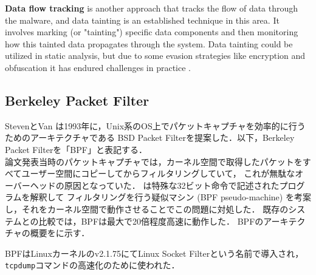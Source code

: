 \textbf{Data flow tracking} is another approach that tracks the flow of data through the malware, and data tainting is an established
technique in this area. It involves marking (or "tainting") specific data components and then monitoring
how this tainted data propagates through the system.
Data tainting could be utilized in static analysis, but due to some evasion strategies like encryption and obfuscation
it has endured challenges in practice \cite{alashjee2019dynamic}.




\subsection{Berkeley Packet Filter}
StevenとVan \cite{mccanne1993bsd}は1993年に，Unix系のOS上でパケットキャプチャを効率的に行うためのアーキテクチャである
BSD Packet Filterを提案した．以下，Berkeley Packet Filterを「BPF」と表記する． \\
論文発表当時のパケットキャプチャでは，カーネル空間で取得したパケットをすべてユーザー空間にコピーしてからフィルタリングしていて，
これが無駄なオーバーヘッドの原因となっていた．
\cite{mccanne1993bsd}は特殊な32ビット命令で記述されたプログラムを解釈して
フィルタリングを行う疑似マシン (BPF pseudo-machine) を考案し，それをカーネル空間で動作させることでこの問題に対処した．
既存のシステムとの比較では，BPFは最大で20倍程度高速に動作した．
BPFのアーキテクチャの概要をに示す．

BPFはLinuxカーネルのv2.1.75にてLinux Socket Filterという名前で導入され，\texttt{tcpdump}コマンドの高速化のために使われた．

